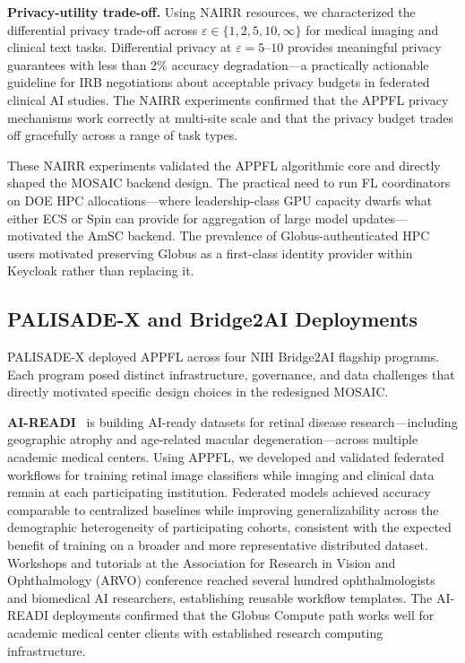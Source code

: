 \documentclass[conference]{IEEEtran}
\begin{document}
\textbf{Privacy-utility trade-off.}
Using NAIRR resources, we characterized the differential privacy
trade-off across $\varepsilon \in \{1, 2, 5, 10, \infty\}$ for
medical imaging and clinical text tasks. Differential privacy at
$\varepsilon = 5$--$10$ provides meaningful privacy guarantees with
less than 2\% accuracy degradation---a practically actionable
guideline for IRB negotiations about acceptable privacy budgets in
federated clinical AI studies. The NAIRR experiments confirmed that
the APPFL privacy mechanisms work correctly at multi-site scale and
that the privacy budget trades off gracefully across a range of
task types.

These NAIRR experiments validated the APPFL algorithmic core and
directly shaped the MOSAIC backend design. The practical need to run
FL coordinators on DOE HPC allocations---where leadership-class GPU
capacity dwarfs what either ECS or Spin can provide for aggregation
of large model updates---motivated the AmSC backend. The prevalence
of Globus-authenticated HPC users motivated preserving Globus as a
first-class identity provider within Keycloak rather than replacing it.

\subsection{PALISADE-X and Bridge2AI Deployments}

PALISADE-X deployed APPFL across four NIH Bridge2AI flagship programs.
Each program posed distinct infrastructure, governance, and data
challenges that directly motivated specific design choices in the
redesigned MOSAIC.

\textbf{AI-READI}~\cite{aireadi_arvo} is building AI-ready datasets
for retinal disease research---including geographic atrophy and
age-related macular degeneration---across multiple academic medical
centers. Using APPFL, we developed and validated federated workflows
for training retinal image classifiers while imaging and clinical data
remain at each participating institution. Federated models achieved
accuracy comparable to centralized baselines while improving
generalizability across the demographic heterogeneity of participating
cohorts, consistent with the expected benefit of training on a broader
and more representative distributed dataset. Workshops and tutorials
at the Association for Research in Vision and Ophthalmology (ARVO)
conference reached several hundred ophthalmologists and biomedical AI
researchers, establishing reusable workflow templates. The AI-READI
deployments confirmed that the Globus Compute path works well for
academic medical center clients with established research computing
infrastructure.
\end{document}
